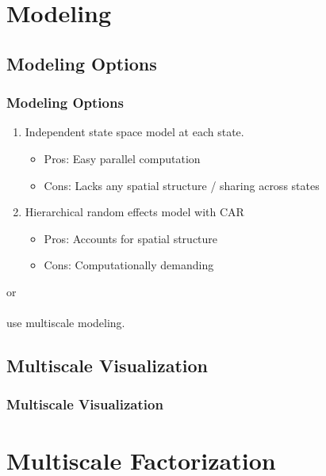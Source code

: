 \documentclass{beamer}
\begin{document}
\section{Modeling}
\subsection{Modeling Options}
\begin{frame}
	\frametitle{Modeling Options}
	\begin{enumerate}
	\item Independent state space model at each state.
	\begin{itemize}
	\item Pros: Easy parallel computation
	\item Cons: Lacks any spatial structure / sharing across states
	\end{itemize}
	\item Hierarchical random effects model with CAR
	\begin{itemize}
	\item Pros: Accounts for spatial structure
	\item Cons: Computationally demanding
	\end{itemize}
	\end{enumerate}
	or \\~\\
	use multiscale modeling.
\end{frame}
\subsection{Multiscale Visualization}
\begin{frame}
	\frametitle{Multiscale Visualization}
\end{frame}
\section{Multiscale Factorization}
\end{document}
